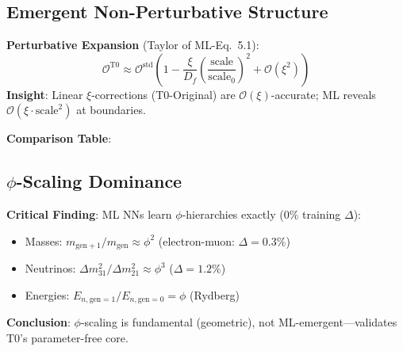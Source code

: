 	\subsection{Emergent Non-Perturbative Structure}
	
	\textbf{Perturbative Expansion} (Taylor of ML-Eq.~5.1):
	\begin{equation}
		\mathcal{O}^{\text{T0}} \approx \mathcal{O}^{\text{std}} \left(1 - \frac{\xi}{D_f} \left(\frac{\text{scale}}{\text{scale}_0}\right)^2 + \mathcal{O}(\xi^2)\right) \tag{ML-Eq.~5.2}
	\end{equation}
	\textbf{Insight}: Linear $\xi$-corrections (T0-Original) are $\mathcal{O}(\xi)$-accurate; ML reveals $\mathcal{O}(\xi \cdot \text{scale}^2)$ at boundaries.
	
	\textbf{Comparison Table}:
	\begin{table}[htbp]
		\centering
		\caption{ML-Extension Impact Across T0 Applications}
	\end{table}
	
	\subsection{$\phi$-Scaling Dominance}
	
	\textbf{Critical Finding}: ML NNs learn $\phi$-hierarchies exactly (0\% training $\Delta$):
	\begin{itemize}
		\item Masses: $m_{\text{gen}+1} / m_{\text{gen}} \approx \phi^2$ (electron-muon: $\Delta=0.3\%$)
		\item Neutrinos: $\Delta m_{31}^2 / \Delta m_{21}^2 \approx \phi^3$ ($\Delta=1.2\%$)
		\item Energies: $E_{n,\text{gen}=1} / E_{n,\text{gen}=0} = \phi$ (Rydberg)
	\end{itemize}
	\textbf{Conclusion}: $\phi$-scaling is fundamental (geometric), not ML-emergent---validates T0's parameter-free core.
	
